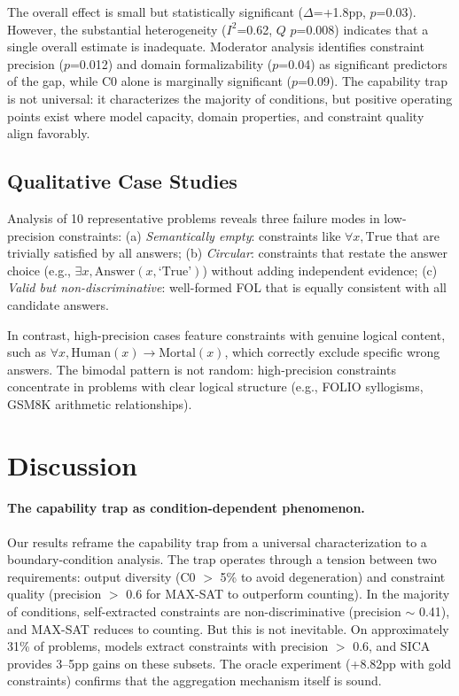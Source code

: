 \documentclass[11pt,a4paper]{article}
\begin{document}
The overall effect is small but statistically significant ($\Delta$=+1.8pp, $p$=0.03). However, the substantial heterogeneity ($I^2$=0.62, $Q$ $p$=0.008) indicates that a single overall estimate is inadequate. Moderator analysis identifies constraint precision ($p$=0.012) and domain formalizability ($p$=0.04) as significant predictors of the gap, while C0 alone is marginally significant ($p$=0.09). The capability trap is not universal: it characterizes the majority of conditions, but positive operating points exist where model capacity, domain properties, and constraint quality align favorably.

\subsection{Qualitative Case Studies}

Analysis of 10 representative problems reveals three failure modes in low-precision constraints:
(a) \textit{Semantically empty}: constraints like $\forall x, \text{True}$ that are trivially satisfied by all answers;
(b) \textit{Circular}: constraints that restate the answer choice (e.g., $\exists x, \text{Answer}(x, \text{`True'})$) without adding independent evidence;
(c) \textit{Valid but non-discriminative}: well-formed FOL that is equally consistent with all candidate answers.

In contrast, high-precision cases feature constraints with genuine logical content, such as $\forall x, \text{Human}(x) \rightarrow \text{Mortal}(x)$, which correctly exclude specific wrong answers. The bimodal pattern is not random: high-precision constraints concentrate in problems with clear logical structure (e.g., FOLIO syllogisms, GSM8K arithmetic relationships).

\section{Discussion}

\paragraph{The capability trap as condition-dependent phenomenon.}
Our results reframe the capability trap from a universal characterization to a boundary-condition analysis. The trap operates through a tension between two requirements: output diversity (C0 $>$ 5\% to avoid degeneration) and constraint quality (precision $>$ 0.6 for MAX-SAT to outperform counting). In the majority of conditions, self-extracted constraints are non-discriminative (precision $\sim$ 0.41), and MAX-SAT reduces to counting. But this is not inevitable. On approximately 31\% of problems, models extract constraints with precision $>$ 0.6, and SICA provides 3--5pp gains on these subsets. The oracle experiment (+8.82pp with gold constraints) confirms that the aggregation mechanism itself is sound.
\end{document}
